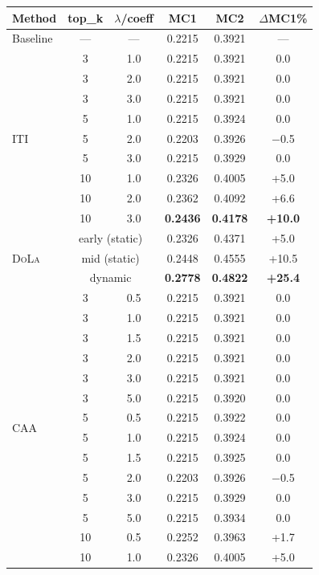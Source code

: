 \documentclass{article}
\newcommand{\iti}{\textsc{ITI}}
\newcommand{\dola}{\textsc{DoLa}}
\newcommand{\caa}{\textsc{CAA}}
\begin{document}
\begin{table}[h]
\centering
\small
\begin{tabular}{lccccc}
\toprule
\textbf{Method} & \textbf{top\_k} & \textbf{$\lambda$/coeff} & \textbf{MC1} & \textbf{MC2} & \textbf{$\Delta$MC1\%} \\
\midrule
Baseline & --- & --- & 0.2215 & 0.3921 & --- \\
\midrule
\multirow{9}{*}{\iti{}} & 3 & 1.0 & 0.2215 & 0.3921 & 0.0 \\
 & 3 & 2.0 & 0.2215 & 0.3921 & 0.0 \\
 & 3 & 3.0 & 0.2215 & 0.3921 & 0.0 \\
 & 5 & 1.0 & 0.2215 & 0.3924 & 0.0 \\
 & 5 & 2.0 & 0.2203 & 0.3926 & $-$0.5 \\
 & 5 & 3.0 & 0.2215 & 0.3929 & 0.0 \\
 & 10 & 1.0 & 0.2326 & 0.4005 & +5.0 \\
 & 10 & 2.0 & 0.2362 & 0.4092 & +6.6 \\
 & 10 & 3.0 & \textbf{0.2436} & \textbf{0.4178} & \textbf{+10.0} \\
\midrule
\multirow{3}{*}{\dola{}} & \multicolumn{2}{c}{early (static)} & 0.2326 & 0.4371 & +5.0 \\
 & \multicolumn{2}{c}{mid (static)} & 0.2448 & 0.4555 & +10.5 \\
 & \multicolumn{2}{c}{dynamic} & \textbf{0.2778} & \textbf{0.4822} & \textbf{+25.4} \\
\midrule
\multirow{18}{*}{\caa{}} & 3 & 0.5 & 0.2215 & 0.3921 & 0.0 \\
 & 3 & 1.0 & 0.2215 & 0.3921 & 0.0 \\
 & 3 & 1.5 & 0.2215 & 0.3921 & 0.0 \\
 & 3 & 2.0 & 0.2215 & 0.3921 & 0.0 \\
 & 3 & 3.0 & 0.2215 & 0.3921 & 0.0 \\
 & 3 & 5.0 & 0.2215 & 0.3920 & 0.0 \\
 & 5 & 0.5 & 0.2215 & 0.3922 & 0.0 \\
 & 5 & 1.0 & 0.2215 & 0.3924 & 0.0 \\
 & 5 & 1.5 & 0.2215 & 0.3925 & 0.0 \\
 & 5 & 2.0 & 0.2203 & 0.3926 & $-$0.5 \\
 & 5 & 3.0 & 0.2215 & 0.3929 & 0.0 \\
 & 5 & 5.0 & 0.2215 & 0.3934 & 0.0 \\
 & 10 & 0.5 & 0.2252 & 0.3963 & +1.7 \\
 & 10 & 1.0 & 0.2326 & 0.4005 & +5.0 \\

\end{tabular}
\end{table}
\end{document}
